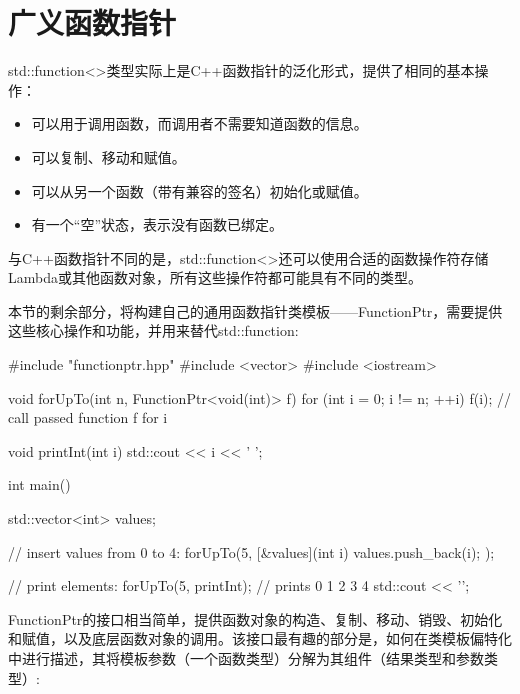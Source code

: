 \section{广义函数指针}
std::function<>类型实际上是C++函数指针的泛化形式，提供了相同的基本操作：

\begin{itemize}
\item 
可以用于调用函数，而调用者不需要知道函数的信息。

\item 
可以复制、移动和赋值。

\item 
可以从另一个函数（带有兼容的签名）初始化或赋值。

\item 
有一个“空”状态，表示没有函数已绑定。
\end{itemize}

与C++函数指针不同的是，std::function<>还可以使用合适的函数操作符存储Lambda或其他函数对象，所有这些操作符都可能具有不同的类型。

本节的剩余部分，将构建自己的通用函数指针类模板——FunctionPtr，需要提供这些核心操作和功能，并用来替代std::function:

\begin{cpp}
#include "functionptr.hpp"
#include <vector>
#include <iostream>

void forUpTo(int n, FunctionPtr<void(int)> f)
{
	for (int i = 0; i != n; ++i)
	{
		f(i); // call passed function f for i
	}
}

void printInt(int i)
{
	std::cout << i << ' ';
}

int main()
{
	std::vector<int> values;
	
	// insert values from 0 to 4:
	forUpTo(5,
			[&values](int i) {
				values.push_back(i);
			});
		
	// print elements:
	forUpTo(5,
			printInt); // prints 0 1 2 3 4
	std::cout << '\n';
}
\end{cpp}

FunctionPtr的接口相当简单，提供函数对象的构造、复制、移动、销毁、初始化和赋值，以及底层函数对象的调用。该接口最有趣的部分是，如何在类模板偏特化中进行描述，其将模板参数（一个函数类型）分解为其组件（结果类型和参数类型）:

